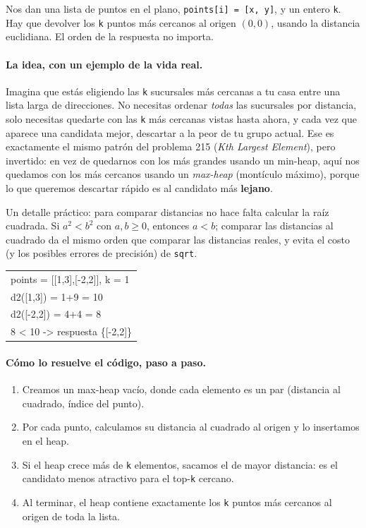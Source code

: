 
Nos dan una lista de puntos en el plano, \texttt{points[i] = [x, y]}, y un
entero \texttt{k}. Hay que devolver los \texttt{k} puntos más cercanos al
origen $(0,0)$, usando la distancia euclidiana. El orden de la respuesta no
importa.

\paragraph{La idea, con un ejemplo de la vida real.} Imagina que estás
eligiendo las \texttt{k} sucursales más cercanas a tu casa entre una lista
larga de direcciones. No necesitas ordenar \emph{todas} las sucursales por
distancia, solo necesitas quedarte con las \texttt{k} más cercanas vistas
hasta ahora, y cada vez que aparece una candidata mejor, descartar a la peor
de tu grupo actual. Ese es exactamente el mismo patrón del problema 215
(\emph{Kth Largest Element}), pero invertido: en vez de quedarnos con los
más grandes usando un min-heap, aquí nos quedamos con los más cercanos
usando un \emph{max-heap} (montículo máximo), porque lo que queremos
descartar rápido es al candidato más \textbf{lejano}.

Un detalle práctico: para comparar distancias no hace falta calcular la raíz
cuadrada. Si $a^2 < b^2$ con $a, b \geq 0$, entonces $a < b$; comparar las
distancias al cuadrado da el mismo orden que comparar las distancias reales,
y evita el costo (y los posibles errores de precisión) de \texttt{sqrt}.

\begin{center}
\ttfamily
\begin{tabular}{l}
points = [[1,3],[-2,2]], k = 1\\
d2([1,3]) = 1+9 = 10\\
d2([-2,2]) = 4+4 = 8\\
8 < 10 -> respuesta \{[-2,2]\}\\
\end{tabular}
\end{center}

\paragraph{Cómo lo resuelve el código, paso a paso.}
\begin{enumerate}
  \item Creamos un max-heap vacío, donde cada elemento es un par
        (distancia al cuadrado, índice del punto).
  \item Por cada punto, calculamos su distancia al cuadrado al origen y lo
        insertamos en el heap.
  \item Si el heap crece más de \texttt{k} elementos, sacamos el de mayor
        distancia: es el candidato menos atractivo para el top-\texttt{k}
        cercano.
  \item Al terminar, el heap contiene exactamente los \texttt{k} puntos más
        cercanos al origen de toda la lista.
\end{enumerate}

